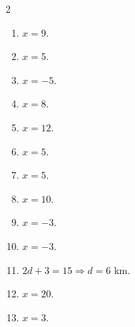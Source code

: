 \documentclass[11pt]{article}
\begin{document}
\begin{keybox}
\begin{multicols}{2}
\small
\begin{enumerate}[leftmargin=*,itemsep=3pt]
  \item $x=9$.
  \item $x=5$.
  \item $x=-5$.
  \item $x=8$.
  \item $x=12$.
  \item $x=5$.
  \item $x=5$.
  \item $x=10$.
  \item $x=-3$.
  \item $x=-3$.
  \item $2d+3=15\Rightarrow d=6$ km.
  \item $x=20$.
  \item $x=3$.
\end{enumerate}
\end{multicols}
\end{keybox}
\end{document}
